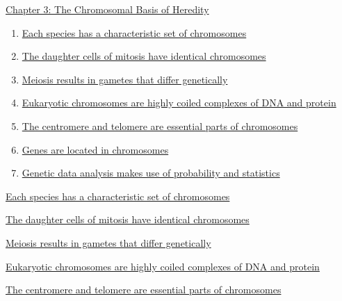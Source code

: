 \documentclass[12pt,letterpaper]{article}
\newcommand{\thetitle}{\hypertarget{home}{Essential Genetics and Genomics}}
\begin{document}
\renewcommand{\thetitle}{\hypertarget{3}{The Chromosomal Basis of Heredity}}
\hypertarget{3}{} 

\begin{chapbox}{\hyperlink{home}{Chapter 3: The Chromosomal Basis of Heredity}}
    \begin{enumerate}
        \item \hyperlink{3.1}{Each species has a characteristic set of chromosomes}
        \item \hyperlink{3.2}{The daughter cells of mitosis have identical chromosomes}
        \item \hyperlink{3.3}{Meiosis results in gametes that differ genetically}
        \item \hyperlink{3.4}{Eukaryotic chromosomes are highly coiled complexes of DNA and protein}
        \item \hyperlink{3.5}{The centromere and telomere are essential parts of chromosomes}
        \item \hyperlink{3.6}{Genes are located in chromosomes}
        \item \hyperlink{3.7}{Genetic data analysis makes use of probability and statistics}
    \end{enumerate}
\end{chapbox}


\hypertarget{3.1}{}
\begin{secbox}{\hyperlink{3}{Each species has a characteristic set of chromosomes}}{

}\end{secbox}

\hypertarget{3.2}{}
\begin{secbox}{\hyperlink{3}{The daughter cells of mitosis have identical chromosomes}}{

}\end{secbox}

\hypertarget{3.3}{}
\begin{secbox}{\hyperlink{3}{Meiosis results in gametes that differ genetically}}{

}\end{secbox}

\hypertarget{3.4}{}
\begin{secbox}{\hyperlink{3}{Eukaryotic chromosomes are highly coiled complexes of DNA and protein}}{

}\end{secbox}

\hypertarget{3.5}{}
\begin{secbox}{\hyperlink{3}{The centromere and telomere are essential parts of chromosomes}}{

}\end{secbox}
\end{document}
